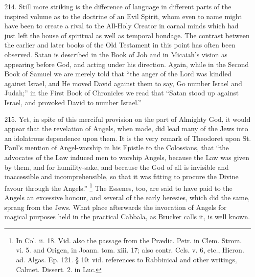214.
Still more striking is the difference of language in different parts
of the inspired volume as to the doctrine of an Evil Spirit, whom even
to name might have been to create a rival to the All-Holy Creator in
carnal minds which had just left the house of spiritual as well
as temporal bondage. The contrast between the earlier and later books
of the Old Testament in this point has often been observed. Satan is
described in the Book of Job and in Micaiah's vision as appearing
before God, and acting under his direction. Again, while in the Second
Book of Samuel we are merely told that ``the anger of the Lord was
kindled against Israel, and He moved David against them to say, Go
number Israel and Judah;'' in the First Book of Chronicles we read that
``Satan stood up against Israel, and provoked David to number Israel.''

215.
Yet, in spite of this merciful provision on the part of Almighty God,
it would appear that the revelation of Angels, when made, did lead
many of the Jews into an idolatrous dependence upon them. It is the
very remark of Theodoret upon St. Paul's mention of Angel-worship in
his Epistle to the Colossians, that ``the advocates of the Law induced
men to worship Angels, because the Law was given by them, and for
humility-sake, and because the God of all is invisible and
inaccessible and incomprehensible, so that it was fitting to procure
the Divine favour through the Angels.'' \footnote{In Col. ii. 18. Vid. also the passage from the Prædic. Petr. in Clem.
Strom. vi. 5. and Origen, in Joann. tom. xiii. 17; also contr. Cels.
v. 6, etc., Hieron. ad. Algas. Ep. 121. § 10: vid. references to
Rabbinical and other writings, Calmet. Dissert. 2. in Luc.} The Essenes, too, are said to have paid to the Angels an
excessive honour, and several of the early heresies, which did the
same, sprang from the Jews. What place afterwards the invocation of
Angels for magical purposes held in the practical Cabbala, as Brucker
calls it, is well known.

